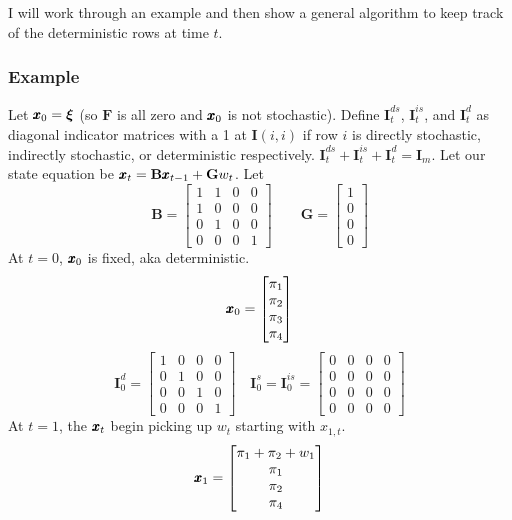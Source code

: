 \documentclass[]{article}
\def\xixi{\mbox{\boldmath $\xi$}}
\def\UPS{\mbox{\boldmath $\Upsilon$}}
\def\BB{\mbox{$\mathbf B$}}	\def\bb{\mbox{$\mathbf b$}} \def\Bb{\mbox{$\mathbf J$}} \def\Ba{\mbox{$\mathbf L$}} \def\Bm{\UPS}
\def\FF{\mbox{$\mathbf F$}} \def\ff{\mbox{$\mathbf f$}}
\def\GG{\mbox{$\mathbf G$}}	\def\gg{\mbox{$\mathbf g$}}
\def\II{\mbox{$\mathbf I$}} \def\ii{\mbox{$\mathbf i$}}
\begin{document}
I will work through an example and then show a general algorithm to keep track of the deterministic rows at time $t$.

\subsubsection*{Example}

Let $\xx_0=\xixi$ (so $\FF$ is all zero and $\mbox{$\pmb{x}$}_0$ is not stochastic).  Define $\II_t^{ds}$, $\II_t^{is}$, and $\II_t^d$ as diagonal indicator matrices with a 1 at $\II(i,i)$ if row $i$ is directly stochastic, indirectly stochastic, or deterministic respectively.  $\II_t^{ds}+\II_t^{is}+\II_t^d=\II_m$.  Let our state equation be $\xx_t=\BB\xx_{t-1}+\GG w_t$.
Let
\begin{equation}
\BB=\begin{bmatrix}
1&1&0&0\\
1&0&0&0\\
0&1&0&0\\
0&0&0&1
\end{bmatrix}\quad\quad
\GG=\begin{bmatrix}
1\\
0\\
0\\
0
\end{bmatrix}
\end{equation}
At $t=0$, $\mbox{$\pmb{x}$}_0$ is fixed, aka deterministic.
\begin{equation}
\mbox{$\pmb{x}$}_0=\begin{bmatrix}
\pi_1\\
\pi_2\\
\pi_3\\
\pi_4
\end{bmatrix}
\end{equation}
\begin{equation}
\II_0^d=\begin{bmatrix}
1&0&0&0\\
0&1&0&0\\
0&0&1&0\\
0&0&0&1
\end{bmatrix}
\quad
\II_0^s=\II_0^{is}=\begin{bmatrix}
0&0&0&0\\
0&0&0&0\\
0&0&0&0\\
0&0&0&0
\end{bmatrix}
\end{equation}
At $t=1$, the $\mbox{$\pmb{x}$}_t$ begin picking up $w_t$ starting with $x_{1,t}$.
\begin{equation}
\mbox{$\pmb{x}$}_1=\begin{bmatrix}
\pi_1+\pi_2+w_1\\
\pi_1\\
\pi_2\\
\pi_4
\end{bmatrix}
\end{equation}
\end{document}
